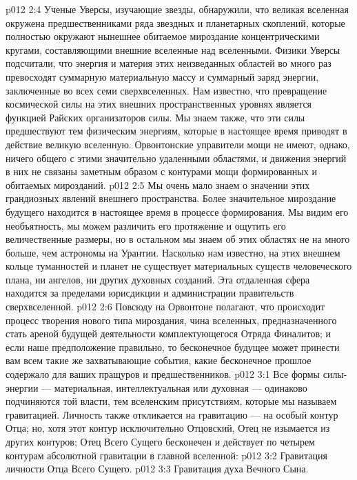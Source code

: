 \vs p012 2:4 \pc Ученые Уверсы, изучающие звезды, обнаружили, что великая вселенная окружена предшественниками ряда звездных и планетарных скоплений, которые полностью окружают нынешнее обитаемое мироздание концентрическими кругами, составляющими внешние вселенные над вселенными. Физики Уверсы подсчитали, что энергия и материя этих неизведанных областей во много раз превосходят суммарную материальную массу и суммарный заряд энергии, заключенные во всех семи сверхвселенных. Нам известно, что превращение космической силы на этих внешних пространственных уровнях является функцией Райских организаторов силы. Мы знаем также, что эти силы предшествуют тем физическим энергиям, которые в настоящее время приводят в действие великую вселенную. Орвонтонские управители мощи не имеют, однако, ничего общего с этими значительно удаленными областями, и движения энергий в них не связаны заметным образом с контурами мощи формированных и обитаемых мирозданий.
\vs p012 2:5 \pc Мы очень мало знаем о значении этих грандиозных явлений внешнего пространства. Более значительное мироздание будущего находится в настоящее время в процессе формирования. Мы видим его необъятность, мы можем различить его протяжение и ощутить его величественные размеры, но в остальном мы знаем об этих областях не на много больше, чем астрономы на Урантии. Насколько нам известно, на этих внешнем кольце туманностей и планет не существует материальных существ человеческого плана, ни ангелов, ни других духовных созданий. Эта отдаленная сфера находится за пределами юрисдикции и администрации правительств сверхвселенной.
\vs p012 2:6 Повсюду на Орвонтоне полагают, что происходит процесс творения нового типа мироздания, чина вселенных, предназначенного стать ареной будущей деятельности комплектующегося Отряда Финалитов; и если наше предположение правильно, то бесконечное будущее может принести вам всем такие же захватывающие события, какие бесконечное прошлое содержало для ваших пращуров и предшественников.
\vs p012 3:1 Все формы силы\hyp{}энергии --- материальная, интеллектуальная или духовная --- одинаково подчиняются той власти, тем вселенским присутствиям, которые мы называем гравитацией. Личность также откликается на гравитацию --- на особый контур Отца; но, хотя этот контур исключительно Отцовский, Отец не изымается из других контуров; Отец Всего Сущего бесконечен и действует по  четырем контурам абсолютной гравитации в главной вселенной:
\vs p012 3:2 \bibnobreakspace Гравитация личности Отца Всего Сущего.
\vs p012 3:3 \bibnobreakspace Гравитация духа Вечного Сына.
